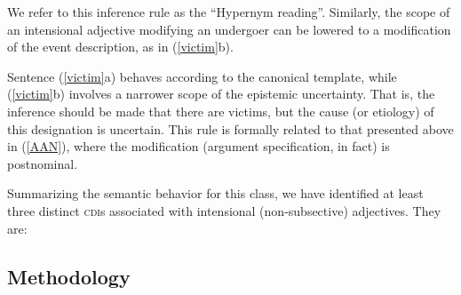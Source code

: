 \documentclass[10pt]{article}
\begin{document}
\noindent We refer to this inference rule as the ``Hypernym reading''. 
Similarly, the scope of an intensional adjective modifying an undergoer can be lowered to a modification of the event description, as  in (\ref{victim}b). 

\vspace{-0.5em}
\vspace{-0.5em}


\noindent Sentence  (\ref{victim}a) behaves according to the canonical template, while  (\ref{victim}b) involves a narrower scope of the epistemic uncertainty. That is, the inference should be made that there are victims, but the cause (or etiology) of this designation is uncertain. This rule is formally related to that presented above in (\ref{AAN}), where the modification (argument specification, in fact) is postnominal. 

\vspace{-0.5em}
\vspace{-0.5em}


\noindent Summarizing the semantic behavior for this class, we have identified at least three distinct \textsc{cdi}s associated with intensional (non-subsective) adjectives. They are:

\vspace{-0.5em}



\subsection{Methodology\label{prelim}}
\vspace {-3mm}
\end{document}
